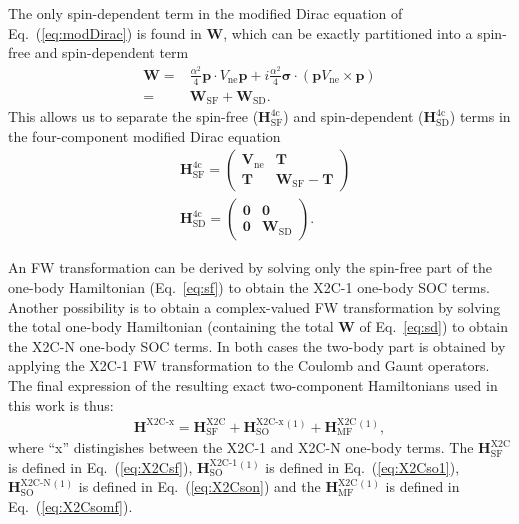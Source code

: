 \documentclass[10pt,aps,prb,twocolumn,amsmath,amssymb,superscriptaddress]{revtex4-1}
\renewcommand\b[1]{\ensuremath{\mathbf{#1}}}
\newcommand\B[1]  {\ensuremath{\pmb #1}}
\begin{document}
The only spin-dependent term in the modified Dirac equation of Eq.~(\ref{eq:modDirac}) is found in $\b{W}$, which can be exactly partitioned into a spin-free and spin-dependent term
\begin{align}
    \b{W}
    =& \frac{\alpha^2}{4}\b{p}\cdot V_\text{ne}\b{p} + i\frac{\alpha^2}{4}\B{\sigma}\cdot\left(\b{p} V_\text{ne}\times\b{p}\right)\nonumber\\
   =& \b{W}_\text{SF} + \b{W}_\text{SD}\label{eq:sd}
.\end{align}
This allows us to separate the spin-free ($\b{H}^\text{4c}_\text{SF}$) and spin-dependent ($\b{H}^\text{4c}_\text{SD}$) terms in the four-component modified Dirac equation 
\begin{align}
&\b{H}^\text{4c}_\text{SF} = \begin{pmatrix}
    \b{V}_\text{ne}& \b{T}\\
    \b{T}& \b{W}_\text{SF} - \b{T}
\end{pmatrix}\label{eq:sf}\\
&\b{H}^\text{4c}_\text{SD} = \begin{pmatrix}
    \b{0}& \b{0}\\
    \b{0}& \b{W}_\text{SD}
\end{pmatrix}.
\end{align}

An FW transformation can be derived by solving only the spin-free part of the one-body Hamiltonian (Eq.~\ref{eq:sf}) to obtain the X2C-1 one-body SOC terms\cite{Li2012,Li2013a,Li2014}. Another possibility is to obtain a complex-valued FW transformation by solving the total one-body Hamiltonian (containing the total $\b{W}$ of Eq.~\ref{eq:sd}) to obtain the X2C-N one-body SOC terms\cite{Cheng2014}. In both cases the two-body part is obtained by applying the X2C-1 FW transformation to the Coulomb and Gaunt operators.
The final expression of the resulting exact two-component Hamiltonians used in this work is thus:
\begin{align}
    \b{H}^\text{X2C-x}=\b{H}^\text{X2C}_\text{SF}+ \b{H}^\text{X2C-x}_\text{SO}{}^{(1)} + \b{H}^\text{X2C}_\text{MF}{}^{(1)}\label{eq:x2ceq}
,\end{align}
where ``x'' distingishes between the X2C-1 and X2C-N one-body terms. The $\b{H}^\text{X2C}_\text{SF}$ is defined in Eq.~(\ref{eq:X2Csf}), $\b{H}^\text{X2C-1}_\text{SO}{}^{(1)}$ is defined in Eq.~(\ref{eq:X2Cso1}), $\b{H}^\text{X2C-N}_\text{SO}{}^{(1)}$ is defined in Eq.~(\ref{eq:X2Cson}) and the $\b{H}^\text{X2C}_\text{MF}{}^{(1)}$ is defined in Eq.~(\ref{eq:X2Csomf}).
\end{document}

